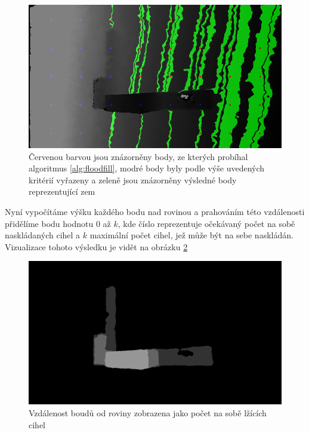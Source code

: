 \documentclass[twoside]{ctuthesis}
\begin{document}
\begin{figure}
    \centering
    \includegraphics[width = \linewidth]{pictures/prob0001body_gnd.png}
    \caption{Červenou barvou jsou znázorněny body, ze kterých probíhal algoritmus \ref{alg:floodfill}, modré body byly podle výše uvedených kritérií vyřazeny a zeleně jsou znázorněny výsledné body reprezentující zem}
    \label{fig:floodfill}
\end{figure}

Nyní vypočítáme výšku každého bodu nad rovinou a prahováním této vzdálenosti přidělíme bodu hodnotu 0 až $k$, kde číslo reprezentuje očekávaný počet na sobě naskládaných cihel a $k$ maximální počet cihel, jež může být na sebe naskládán. Vizualizace tohoto výsledku je vidět na obrázku \ref{fig:height_map}

\begin{figure}
    \centering
    \includegraphics[width = \linewidth]{pictures/original_vrstva2_pic1.jpg}
    \caption{Vzdálenost boudů od roviny zobrazena jako počet na sobě lžících cihel}
    \label{fig:height_map}
\end{figure}
\end{document}
